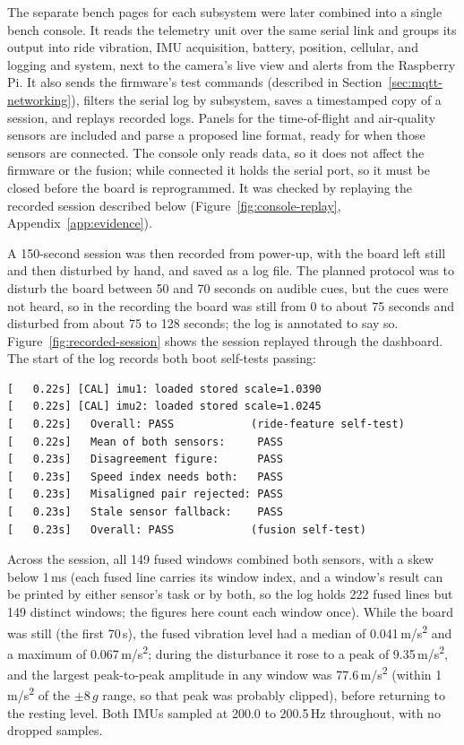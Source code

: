 The separate bench pages for each subsystem were later combined into a single bench console. It reads the telemetry unit over the same serial link and groups its output into ride vibration, IMU acquisition, battery, position, cellular, and logging and system, next to the camera's live view and alerts from the Raspberry Pi. It also sends the firmware's test commands (described in Section~\ref{sec:mqtt-networking}), filters the serial log by subsystem, saves a timestamped copy of a session, and replays recorded logs. Panels for the time-of-flight and air-quality sensors are included and parse a proposed line format, ready for when those sensors are connected. The console only reads data, so it does not affect the firmware or the fusion; while connected it holds the serial port, so it must be closed before the board is reprogrammed. It was checked by replaying the recorded session described below (Figure~\ref{fig:console-replay}, Appendix~\ref{app:evidence}).


A 150-second session was then recorded from power-up, with the board left still and then disturbed by hand, and saved as a log file. The planned protocol was to disturb the board between 50 and 70 seconds on audible cues, but the cues were not heard, so in the recording the board was still from 0 to about 75 seconds and disturbed from about 75 to 128 seconds; the log is annotated to say so. Figure~\ref{fig:recorded-session} shows the session replayed through the dashboard. The start of the log records both boot self-tests passing:

\begin{verbatim}
[   0.22s] [CAL] imu1: loaded stored scale=1.0390
[   0.22s] [CAL] imu2: loaded stored scale=1.0245
[   0.22s]   Overall: PASS            (ride-feature self-test)
[   0.22s]   Mean of both sensors:     PASS
[   0.23s]   Disagreement figure:      PASS
[   0.23s]   Speed index needs both:   PASS
[   0.23s]   Misaligned pair rejected: PASS
[   0.23s]   Stale sensor fallback:    PASS
[   0.23s]   Overall: PASS            (fusion self-test)
\end{verbatim}

Across the session, all 149 fused windows combined both sensors, with a skew below 1\,ms (each fused line carries its window index, and a window's result can be printed by either sensor's task or by both, so the log holds 222 fused lines but 149 distinct windows; the figures here count each window once). While the board was still (the first 70\,s), the fused vibration level had a median of 0.041\,m/s\textsuperscript{2} and a maximum of 0.067\,m/s\textsuperscript{2}; during the disturbance it rose to a peak of 9.35\,m/s\textsuperscript{2}, and the largest peak-to-peak amplitude in any window was 77.6\,m/s\textsuperscript{2} (within 1\,m/s\textsuperscript{2} of the $\pm 8\,g$ range, so that peak was probably clipped), before returning to the resting level. Both IMUs sampled at 200.0 to 200.5\,Hz throughout, with no dropped samples.

